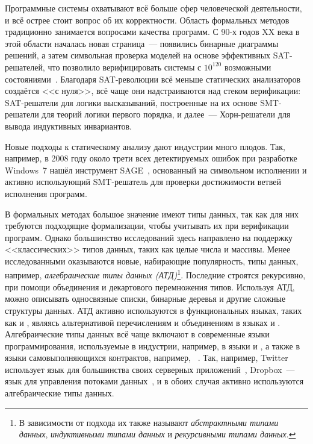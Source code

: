 {\actuality}
Программные системы охватывают всё больше сфер человеческой деятельности, и всё острее стоит вопрос об их корректности.
Область формальных методов традиционно занимается вопросами качества программ. С 90-х годов XX века в этой области началась новая страница~--- появились бинарные диаграммы решений, а затем символьная проверка моделей на основе эффективных SAT-решателей, что позволило верифицировать системы с \(10^{120}\) возможными состояниями~\cite{10.1007/3-540-61474-5_93}. Благодаря SAT-революции всё меньше статических анализаторов создаётся <<с нуля>>, всё чаще они надстраиваются над стеком верификации: SAT-решатели для логики высказываний, построенные на их основе SMT-решатели для теорий логики первого порядка, и далее~--- Хорн-решатели для вывода индуктивных инвариантов.

Новые подходы к статическому анализу дают индустрии много плодов.
Так, например, в 2008 году около трети всех детектируемых ошибок при разработке Windows~7 нашёл инструмент SAGE~\cite{10.1145/2090147.2094081}, основанный на символьном исполнении и активно использующий SMT-решатель для проверки достижимости ветвей исполнения программ.

 В формальных методах большое значение имеют типы данных, так как для них требуются подходящие формализации, чтобы учитывать их при верификации программ. Однако большинство исследований здесь направлено на поддержку <<классических>> типов данных, таких как целые числа и массивы. Менее исследованными оказываются новые, набирающие популярность, типы данных, например, \emph{алгебраические типы данных (АТД)}\footnote{В зависимости от подхода их также называют \emph{абстрактными типами данных}, \emph{индуктивными типами данных} и \emph{рекурсивными типами данных}.}.
Последние строятся рекурсивно, при помощи объединения и декартового перемножения типов. Используя АТД, можно описывать односвязные списки,  бинарные деревья и другие сложные структуры данных.  АТД активно используются в функциональных языках, таких как \haskell{} и \ocaml{},  являясь альтернативой перечислениям и объединениям в языках \clanguage{} и \cplusplus{}. Алгебраические типы данных всё чаще включают в современные языки программирования, используемые в индустрии, например, в языки \rust{} и \scala{}, а также в языки самовыполняющихся контрактов, например, \solidity{}~\cite{8327565}. Так, например, Twitter использует язык \scala{} для большинства своих серверных приложений~\cite{10.1145/1900160.1900170}, Dropbox~--- язык \rust{} для управления потоками данных~\cite{dropboxRust}, и в обоих случая активно используются алгебраические типы данных.

